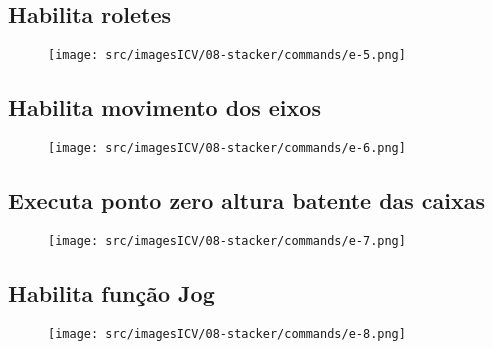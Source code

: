 \newpage
\thispagestyle{fancy}
\vspace*{40 pt}
\subsection{\small {Habilita roletes}}
\vspace*{\fill}
\begin{figure}[h]
    \centering
    \texttt{[image: src/imagesICV/08-stacker/commands/e-5.png]}
\end{figure}
\vspace*{\fill}

\newpage
\thispagestyle{fancy}
\vspace*{40 pt}
\subsection{\small {Habilita movimento dos eixos}}
\vspace*{\fill}
\begin{figure}[h]
    \centering
    \texttt{[image: src/imagesICV/08-stacker/commands/e-6.png]}
\end{figure}
\vspace*{\fill}

\newpage
\thispagestyle{fancy}
\vspace*{40 pt}
\subsection{\small {Executa ponto zero altura batente das caixas}}
\vspace*{\fill}
\begin{figure}[h]
    \centering
    \texttt{[image: src/imagesICV/08-stacker/commands/e-7.png]}
\end{figure}
\vspace*{\fill}

\newpage
\thispagestyle{fancy}
\vspace*{40 pt}
\subsection{\small {Habilita função Jog}}
\vspace*{\fill}
\begin{figure}[h]
    \centering
    \texttt{[image: src/imagesICV/08-stacker/commands/e-8.png]}
\end{figure}
\vspace*{\fill}

